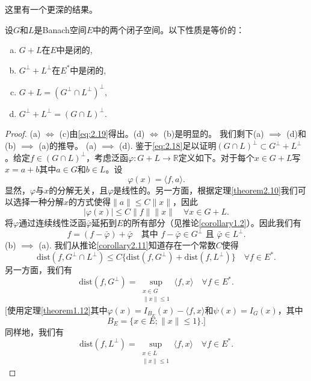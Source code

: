 这里有一个更深的结果。
\begin{theorem}\label{theorem2.16}
设$G$和$L$是Banach空间$E$中的两个闭子空间。以下性质是等价的：
\begin{enumerate}[(a)]
    \item $G+L$在$E$中是闭的,
    \item $G^\perp+L^\perp$在$E^*$中是闭的,
    \item $G+L = (G^\perp \cap L^\perp)^\perp$,
    \item $G^\perp+L^\perp = (G \cap L)^\perp$.
\end{enumerate}
\end{theorem}
\begin{proof}
(a) $\iff$ (c)由\eqref{eq:2.19}得出。(d) $\iff$ (b)是明显的。
我们剩下(a) $\implies$ (d)和(b) $\implies$ (a)的推导。
(a) $\implies$ (d). 鉴于\eqref{eq:2.18}足以证明$(G \cap L)^\perp \subset G^\perp+L^\perp$。给定$f \in (G \cap L)^\perp$，考虑泛函$\varphi: G+L \to \mathbb{R}$定义如下。对于每个$x \in G+L$写$x=a+b$其中$a \in G$和$b \in L$。设
\[ \varphi(x) = \langle f, a \rangle. \]
显然，$\varphi$与$x$的分解无关，且$\varphi$是线性的。另一方面，根据定理\ref{theorem2.10}我们可以选择一种分解$x$的方式使得$\|a\| \leq C\|x\|$，因此
\[ |\varphi(x)| \leq C\|f\| \|x\| \quad \forall x \in G+L. \]
将$\varphi$通过连续线性泛函$\bar{\varphi}$延拓到$E$的所有部分（见推论\ref{corollary1.2}）。因此我们有
\[ f = (f-\bar{\varphi}) + \bar{\varphi} \quad \text{其中 } f-\bar{\varphi} \in G^\perp \text{ 且 } \bar{\varphi} \in L^\perp. \]
(b) $\implies$ (a). 我们从推论\ref{corollary2.11}知道存在一个常数$C$使得
\begin{equation}
\text{dist}(f, G^\perp \cap L^\perp) \leq C\{\text{dist}(f, G^\perp) + \text{dist}(f, L^\perp)\} \quad \forall f \in E^*. \label{eq:2.20}
\end{equation}
另一方面，我们有
\begin{equation}
\text{dist}(f, G^\perp) = \sup_{\substack{x \in G \\ \|x\| \leq 1}} \langle f, x \rangle \quad \forall f \in E^*. \label{eq:2.21}
\end{equation}
[使用定理\ref{theorem1.12}其中$\varphi(x)=I_{B_E}(x)-\langle f,x \rangle$和$\psi(x)=I_{G}(x)$，其中
\[ B_E = \{x \in E; \|x\| \leq 1\}.] \]
同样地，我们有
\begin{equation}
\text{dist}(f, L^\perp) = \sup_{\substack{x \in L \\ \|x\| \leq 1}} \langle f, x \rangle \quad \forall f \in E^*. \label{eq:2.22}
\end{equation}

\end{proof}
